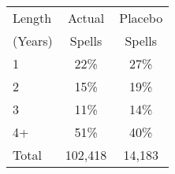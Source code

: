 \begin{tabular}{lcc}
\toprule
Length & Actual & Placebo \\
(Years) & Spells & Spells \\
\midrule
1 & 22\% & 27\% \\
2 & 15\% & 19\% \\
3 & 11\% & 14\% \\
4+ & 51\% & 40\% \\
Total &      102,418 &       14,183 \\
\bottomrule
\end{tabular}
